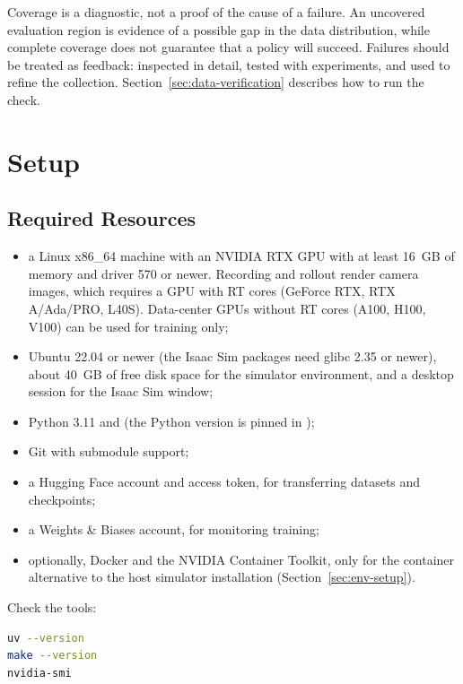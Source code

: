 \documentclass[11pt]{article}
\DeclareRobustCommand{\code}{\codeurl}  %
\begin{document}
Coverage is a diagnostic, not a proof of the cause of a failure. An uncovered evaluation region is evidence of a
possible gap in the data distribution, while complete coverage does not guarantee that a policy will succeed. Failures
should be treated as feedback: inspected in detail, tested with experiments, and used to refine the collection. Section~\ref{sec:data-verification} describes how to run the check.



\section{Setup}
\label{sec:setup}

\subsection{Required Resources}

\begin{itemize}
  \item a Linux x86\_64 machine with an NVIDIA RTX GPU with at least 16~GB of memory and driver 570 or newer. Recording and rollout render camera images, which requires a GPU with RT cores (GeForce RTX, RTX A/Ada/PRO, L40S). Data-center GPUs without RT cores (A100, H100, V100) can be used for training only;
  \item Ubuntu 22.04 or newer (the Isaac Sim packages need glibc 2.35 or newer), about 40~GB of free disk space for the simulator environment, and a desktop session for the Isaac Sim window;
  \item Python 3.11 and \code{uv} (the Python version is pinned in \code{.python-version});
  \item Git with submodule support;
  \item a Hugging Face account and access token, for transferring datasets and checkpoints;
  \item a Weights \& Biases account, for monitoring training;
  \item optionally, Docker and the NVIDIA Container Toolkit, only for the container alternative to the host simulator installation (Section~\ref{sec:env-setup}).
\end{itemize}

Check the tools:
\begin{lstlisting}[language=bash]
uv --version
make --version
nvidia-smi
\end{lstlisting}
\end{document}
